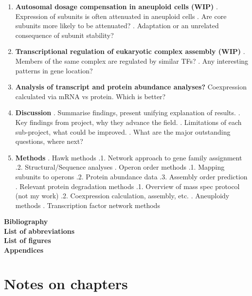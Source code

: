 \documentclass{article}
\begin{document}
\begin{enumerate}
    \item \textbf{Autosomal dosage compensation in aneuploid cells (WIP)}
        . Expression of subunits is often attenuated in aneuploid cells
        . Are core subunits more likely to be attenuated?
        . Adaptation or an unrelated consequence of subunit stability?

    \item \textbf{Transcriptional regulation of eukaryotic complex assembly (WIP)}
        . Members of the same complex are regulated by similar TFs?
        . Any interesting patterns in gene location?

    \item \textbf{Analysis of transcript and protein abundance analyses?}
         Coexpression calculated via mRNA vs protein. Which is better?

    \item \textbf{Discussion}
        . Summarise findings, present unifying explanation of results.
        . Key findings from project, why they advance the field.
        . Limitations of each sub-project, what could be improved.
        . What are the major outstanding questions, where next?

    \item \textbf{Methods}
        . Hawk methods
            .1. Network approach to gene family assignment
            .2. Structural/Sequence analyses
        . Operon order methods
            .1. Mapping subunits to operons
            .2. Protein abundance data
            .3. Assembly order prediction
        . Relevant protein degradation methods
            .1. Overview of mass spec protocol (not my work)
            .2. Coexpression calculation, assembly, etc.
        . Aneuploidy methods
        . Transcription factor network methods
\end{enumerate}
\textbf{Bibliography\\
List of abbreviations\\
List of figures\\
Appendices\\}

\newpage
\section*{Notes on chapters}
\end{document}
